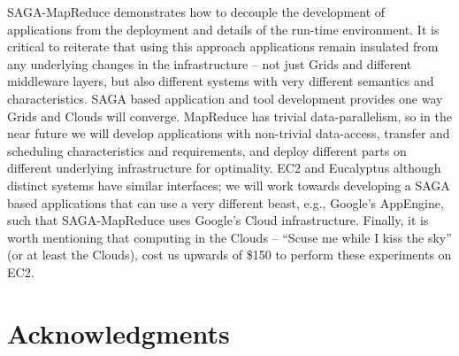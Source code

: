 \documentclass[conference,final]{IEEEtran}
\newcommand{\sagamapreduce }{SAGA-MapReduce }
\begin{document}
\sagamapreduce demonstrates how to decouple the development of
applications from the deployment and details of the run-time
environment.  It is critical to reiterate that using this approach
applications remain insulated from any underlying changes in the
infrastructure -- not just Grids and different middleware layers, but
also different systems with very different semantics and
characteristics.  SAGA based application and tool development provides
one way Grids and Clouds will converge.  MapReduce has trivial
data-parallelism, so in the near future we will develop applications
with non-trivial data-access, transfer and scheduling characteristics
and requirements, and deploy different parts on different underlying
infrastructure for optimality.  
EC2 and Eucalyptus although distinct systems have similar interfaces;
we will work towards developing a SAGA based applications that can use
a very different beast, e.g., Google's AppEngine, such that
\sagamapreduce uses Google's Cloud infrastructure.  Finally, it is
worth mentioning that computing in the Clouds -- ``Scuse me while I
kiss the sky''\cite{purplehaze} (or at least the Clouds), cost us
upwards of \$150 to perform these experiments on EC2.






\section{Acknowledgments}
\end{document}

